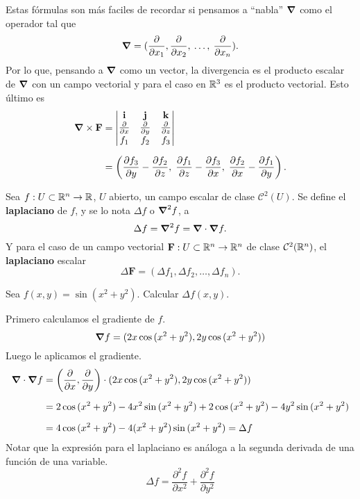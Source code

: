 \begin{obs}
    Estas f\'ormulas son m\'as faciles de recordar si pensamos a ``nabla'' $\grad$ como el operador tal que 
    \[
        \grad = (\frac{\partial}{\partial x_1},\frac{\partial}{\partial x_2},\:\ldots,\: \frac{\partial}{\partial x_n}).  
    \]
    Por lo que, pensando a $\grad$ como un vector, la divergencia es el producto escalar de $\grad$ con un campo vectorial y para el caso en $\mathbb{R}^3$ es el producto vectorial. Esto \'ultimo es
    \begin{align*}
        \grad\times\mathbf{F}&= 
        \begin{vmatrix}
        \mathbf{i} & \mathbf{j} & \mathbf{k} \\
        \frac{\partial}{\partial x} & \frac{\partial}{\partial y} & \frac{\partial}{\partial z} \\
        f_1 & f_2 & f_3
        \end{vmatrix} \\[.2cm]
        &=\left(\frac{\partial f_3}{\partial y}-\frac{\partial f_2}{\partial z},\;\frac{\partial f_1}{\partial z}-\frac{\partial f_3}{\partial x},\;\frac{\partial f_2}{\partial x}-\frac{\partial f_1}{\partial y}\right).
    \end{align*}
\end{obs}
\begin{definition}
    Sea $f:U\subset\mathbb{R}^n\to\mathbb{R}$, $U$ abierto, un campo escalar de clase $\mathcal{C}^2(U)$. Se define el \textbf{laplaciano} de $f$, y se lo nota $\Delta f$ o $\grad^2 f$, a
    \[
        \Delta f=\grad^2f=\grad\cdot\grad f.  
    \]
    Y para el caso de un campo vectorial $\mathbf{F}:U\subset\mathbb{R}^n\to\mathbb{R}^n$ de clase $\mathcal{C}^2(\mathbb{R}^n)$, el \textbf{laplaciano} escalar
    \[
        \Delta\mathbf{F}=(\Delta f_1,\Delta f_2,\ldots,\Delta f_n). 
    \]
\end{definition}

\begin{example}
    Sea $f(x,y)=\sin{(x^2+y^2)}$. Calcular $\Delta f(x,y)$.

    Primero calculamos el gradiente de $f$.
    \[
        \grad f = (2x\cos{(x^2+y^2)}, 2y\cos{(x^2+y^2)})
    \]
    Luego le aplicamos el gradiente.
    \begin{align*}
        \grad\cdot\grad f &= \left(\frac{\partial}{\partial x}, \frac{\partial}{\partial y}\right)\cdot (2x\cos{(x^2+y^2)}, 2y\cos{(x^2+y^2)})\\[.2cm]
        &= 2\cos{(x^2+y^2)}-4x^2\sin{(x^2+y^2)}+2\cos{(x^2+y^2)}-4y^2\sin{(x^2+y^2)}\\[.2cm]
        &=4\cos{(x^2+y^2)}-4(x^2+y^2)\sin{(x^2+y^2)}=\Delta f
    \end{align*}
    Notar que la expresi\'on para el laplaciano es an\'aloga a la segunda derivada de una funci\'on de una variable.
    $$\Delta f=\frac{\partial^2 f}{\partial x^2}+\frac{\partial^2 f}{\partial y^2}$$
\end{example}


